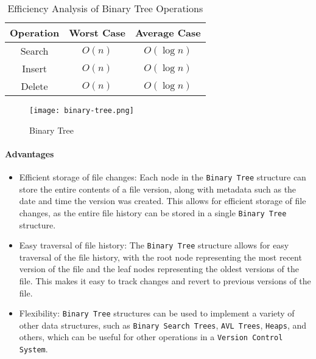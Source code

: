 \begin{table}[h]
    \centering
    \caption{Efficiency Analysis of Binary Tree Operations}
    \label{tab:binary-tree-efficiency-analysis}
    \begin{tabular}{|c|c|c|}
        \hline
        Operation & Worst Case & Average Case \\ \hline
        Search    & $O(n)$     & $O(\log n)$  \\ \hline
        Insert    & $O(n)$     & $O(\log n)$  \\ \hline
        Delete    & $O(n)$     & $O(\log n)$  \\ \hline
    \end{tabular}
\end{table}
\begin{figure}[!htbp]
    \centering
    \texttt{[image: binary-tree.png]}
    \caption{Binary Tree \cite{mcmahon_2020}}
    \label{fig:binary-tree}
\end{figure}
\newpage

\paragraph{Advantages}
\begin{itemize}
    \item Efficient storage of file changes: Each node in the \lstinline{Binary Tree} structure can store the entire contents of a file version, along with metadata such as the date and time the version was created. This allows for efficient storage of file changes, as the entire file history can be stored in a single \lstinline{Binary Tree} structure.
    \item Easy traversal of file history: The \lstinline{Binary Tree} structure allows for easy traversal of the file history, with the root node representing the most recent version of the file and the leaf nodes representing the oldest versions of the file. This makes it easy to track changes and revert to previous versions of the file.
    \item Flexibility: \lstinline{Binary Tree} structures can be used to implement a variety of other data structures, such as \lstinline{Binary Search Trees}, \lstinline{AVL Trees}, \lstinline{Heaps}, and others, which can be useful for other operations in a \lstinline{Version Control System}.
\end{itemize}
